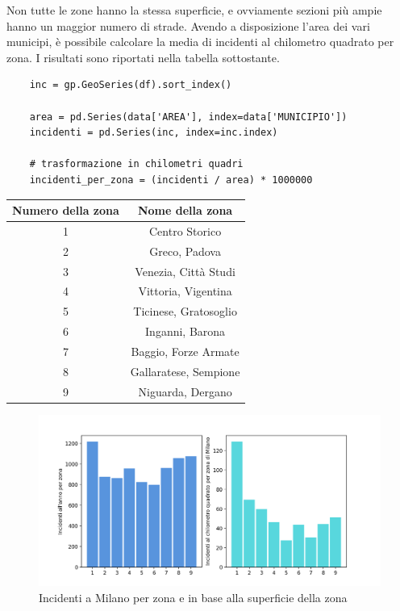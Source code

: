 \documentclass[a4paper,12pt]{report}
\begin{document}
Non tutte le zone hanno la stessa superficie, e ovviamente sezioni più ampie hanno un maggior 
numero di strade. Avendo a disposizione l'area dei vari municipi, 
è possibile calcolare la media di incidenti al chilometro quadrato per zona.
I risultati sono riportati nella tabella sottostante.

\begin{lstlisting}    
    inc = gp.GeoSeries(df).sort_index()

    area = pd.Series(data['AREA'], index=data['MUNICIPIO'])
    incidenti = pd.Series(inc, index=inc.index)

    # trasformazione in chilometri quadri
    incidenti_per_zona = (incidenti / area) * 1000000 
\end{lstlisting}

\begin{center}
    \def\arraystretch{1.5}%
    \begin{tabular}{ |c|c| } 
    \hline
    Numero della zona & Nome della zona \\ 
    \hline
    \rowcolor{TableGray}
    1   &   Centro Storico\\
    2   &   Greco, Padova\\
    \rowcolor{TableGray}
    3   &   Venezia, Città Studi\\
    4   &   Vittoria, Vigentina \\
    \rowcolor{TableGray}
    5   &   Ticinese, Gratosoglio\\
    6   &   Inganni, Barona\\
    \rowcolor{TableGray}
    7   &   Baggio, Forze Armate\\
    8   &   Gallaratese, Sempione\\
    \rowcolor{TableGray}
    9   &   Niguarda, Dergano\\
    \hline
    \end{tabular}
\end{center}

\begin{figure}
    \includegraphics[width=\linewidth]{../src/municipi_milano/incidenti_superf.png}
    \caption{Incidenti a Milano per zona e in base alla superficie della zona}
    \label{fig:incidenti-chilometro}
\end{figure}
\end{document}
